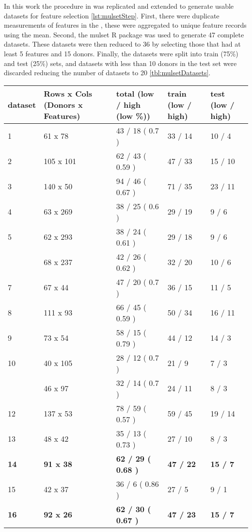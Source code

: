 In this work the procedure in \spaper was replicated and extended to generate usable datasets for feature selection \autoref{lst:mulsetStep}.
First, there were duplicate measurements of features in the \firstvis, these were aggregated to unique feature records using the mean.
Second, the mulset R package was used to generate 47 complete datasets.
These datasets were then reduced to 36 by selecting those that had at least 5 features and 15 donors.
Finally, the datasets were split into train (75\%) and test (25\%) sets, and datasets with less than 10 donors in the test set were discarded reducing the number of datasets to 20 \autoref{tbl:mulsetDatasets}.

\begin{table}[htpb]
    \begin{tabularx}{\textwidth}{XXXXX}
\toprule{}
        dataset & Rows x Cols (Donors x Features) & total (low / high (low \%)) & train (low / high) & test (low / high)\\
\midrule{}
1 & 61 x 78 & 43 / 18 ( 0.7 ) & 33 / 14 & 10 / 4\\
2 & 105 x 101 & 62 / 43 ( 0.59 ) & 47 / 33 & 15 / 10\\
3 & 140 x 50 & 94 / 46 ( 0.67 ) & 71 / 35 & 23 / 11\\
4 & 63 x 269 & 38 / 25 ( 0.6 ) & 29 / 19 & 9 / 6\\
5 & 62 x 293 & 38 / 24 ( 0.61 ) & 29 / 18 & 9 / 6\\
\addlinespace
6 & 68 x 237 & 42 / 26 ( 0.62 ) & 32 / 20 & 10 / 6\\
7 & 67 x 44 & 47 / 20 ( 0.7 ) & 36 / 15 & 11 / 5\\
8 & 111 x 93 & 66 / 45 ( 0.59 ) & 50 / 34 & 16 / 11\\
9 & 73 x 54 & 58 / 15 ( 0.79 ) & 44 / 12 & 14 / 3\\
10 & 40 x 105 & 28 / 12 ( 0.7 ) & 21 / 9 & 7 / 3\\
\addlinespace
11 & 46 x 97 & 32 / 14 ( 0.7 ) & 24 / 11 & 8 / 3\\
12 & 137 x 53 & 78 / 59 ( 0.57 ) & 59 / 45 & 19 / 14\\
13 & 48 x 42 & 35 / 13 ( 0.73 ) & 27 / 10 & 8 / 3\\
\textbf{14} & \textbf{91 x 38} & \textbf{62 / 29 ( 0.68 )} & \textbf{47 / 22} & \textbf{15 / 7}\\
15 & 42 x 37 & 36 / 6 ( 0.86 ) & 27 / 5 & 9 / 1\\
\addlinespace
\textbf{16} & \textbf{92 x 26} & \textbf{62 / 30 ( 0.67 )} & \textbf{47 / 23} & \textbf{15 / 7}\\

\end{tabularx}
\end{table}
